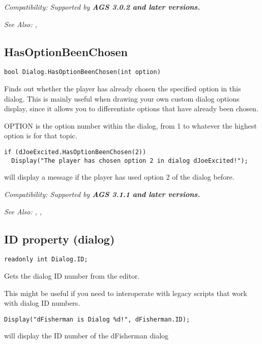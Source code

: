 \it{Compatibility:} Supported by \bf{AGS 3.0.2} and later versions.

\it{See Also:} ,


\subsection{HasOptionBeenChosen}\label{Dialog.HasOptionBeenChosen}%

\begin{verbatim}
bool Dialog.HasOptionBeenChosen(int option)
\end{verbatim}
Finds out whether the player has already chosen the specified option in this
dialog. This is mainly useful when drawing your own custom dialog options
display, since it allows you to differentiate options that have already been chosen.

OPTION is the option number within the dialog, from 1 to whatever the
highest option is for that topic.

\begin{verbatim}
if (dJoeExcited.HasOptionBeenChosen(2))
  Display("The player has chosen option 2 in dialog dJoeExcited!");
\end{verbatim}
will display a message if the player has used option 2 of the dialog before.

\it{Compatibility:} Supported by \bf{AGS 3.1.1} and later versions.

\it{See Also:} ,
,


\subsection{ID property (dialog)}\label{Dialog.ID}%

\begin{verbatim}
readonly int Dialog.ID;
\end{verbatim}
Gets the dialog ID number from the editor.

This might be useful if you need to interoperate with legacy scripts
that work with dialog ID numbers.

\begin{verbatim}
Display("dFisherman is Dialog %d!", dFisherman.ID);
\end{verbatim}
will display the ID number of the dFisherman dialog


